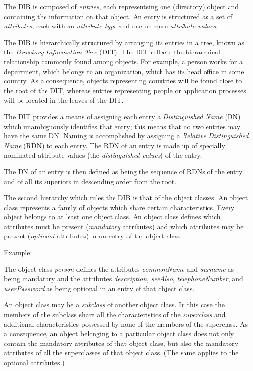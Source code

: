 The DIB is composed of {\em entries}, each representsing one
(directory) object and containing the information on that object.
An entry is structured as a set of {\em attributes}, each with an
{\em attribute type} and one or more {\em attribute values}.

The DIB is hierarchically structured by arranging its entries
in a tree, known as the {\em Directory Information Tree} (DIT).
The DIT reflects the hierarchical relationship commonly found
among objects. For example, a person works for a department,
which belongs to an organization, which has its head office
in some country. As a consequence, objects representing countries
will be found close to the root of the DIT, whereas entries representing
people or application processes will be located in the leaves of the DIT.

The DIT provides a means of assigning each entry a {\em Distinguished
Name} (DN) which unambiguously identifies that entry; this means that
no two entries may have the same DN.
Naming is accomplished by assigning a {\em Relative Distinguished Name}
(RDN) to each entry. The RDN of an entry is made up of specially
nominated attribute values (the {\em distinguished values}) of the
entry.

The DN of an entry is then defined as being the sequence of RDNs of the
entry and of all its superiors in descending order from the root.

The second hierarchy which rules the DIB is that of the object classes.
An object class represents a family of objects which share certain
characteristics. Every object belongs to at least one object class.
An object class defines which attributes must be present ({\em mandatory}
attributes) and which attributes may be present ({\em optional}
attributes) in an entry of the object class.

Example:

The object class {\em person} defines the attributes {\em commonName}
and {\em surname} as being mandatory and the attributes {\em description},
{\em seeAlso}, {\em telephoneNumber}, and {\em userPassword} as being
optional in an entry of that object class.

An object class may be a {\em subclass} of another object class. In
this case the members of the subclass share all the characteristics
of the {\em superclass} and additional characteristics possessed
by none of the members of the superclass. As a consequence, an object
belonging to a particular object class does not only contain
the mandatory attributes of that object class, but also the
mandatory attributes of all the superclasses of that object class.
(The same applies to the optional attributes.)

